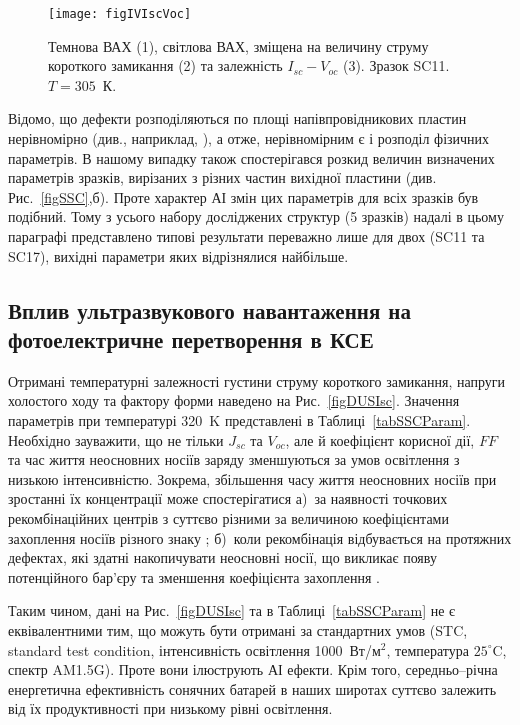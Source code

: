 \begin{figure}
\center
\texttt{[image: figIVIscVoc]}%
\caption{\label{figIVIscVoc}
Темнова ВАХ (1),
світлова ВАХ, зміщена на величину струму короткого замикання (2)
та залежність $I_{sc}-V_{oc}$ (3).
Зразок SC11.
$T=305$~К.
}%
\end{figure}

Відомо, що дефекти розподіляються по площі напівпровідникових пластин нерівномірно (див., наприклад, \cite{Oxide:Chen,Oxide_Schon}),
а отже, нерівномірним є і розподіл фізичних параметрів.
В нашому випадку також спостерігався розкид величин визначених параметрів зразків, вирізаних з різних частин вихідної пластини (див. Рис.~\ref{figSSC},б).
Проте характер АІ змін цих параметрів для всіх зразків був подібний.
Тому з усього набору досліджених структур (5 зразків) надалі в цьому параграфі представлено типові результати переважно лише для двох (SC11 та SC17),
вихідні параметри яких відрізнялися найбільше.



\subsection{Вплив ультразвукового навантаження на фотоелектричне перетворення в КСЕ}

Отримані температурні залежності густини струму короткого замикання, напруги холостого ходу та фактору форми наведено на Рис.~\ref{figDUSIsc}.
Значення параметрів при температурі 320~K представлені в Таблиці~\ref{tabSSCParam}.
Необхідно зауважити, що не тільки $J_{sc}$ та $V_{oc}$, але й коефіцієнт корисної дії, $F\!F$ та час життя неосновних носіїв
заряду зменшуються за умов освітлення з низькою інтенсивністю\cite{LI:Ruhle,LI:Reich,LI:lifetime}.
Зокрема, збільшення часу життя неосновних носіїв при зростанні їх концентрації може спостерігатися
а)~за наявності точкових рекомбінаційних центрів з суттєво різними за величиною коефіцієнтами
захоплення носіїв різного знаку \cite{Breitenstein2013,TauOnIph};
б)~коли рекомбінація відбувається на протяжних дефектах, які здатні накопичувати
неосновні носії, що викликає появу потенційного бар'єру та зменшення коефіцієнта захоплення \cite{Robinson1995,Schroter1995}.

Таким чином, дані на Рис.~\ref{figDUSIsc} та в Таблиці~\ref{tabSSCParam} не є еквівалентними тим, що
можуть бути отримані за стандартних умов (STC, standard test condition, інтенсивність освітлення 1000~Вт/м$^2$,
температура $25^{\circ}$C, спектр AM1.5G).
Проте вони ілюструють АІ ефекти.
Крім того, середньо--річна енергетична ефективність сонячних батарей в наших широтах суттєво залежить від
їх продуктивності при низькому рівні освітлення.


